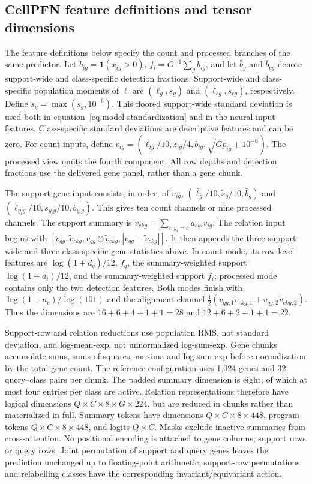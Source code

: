 \subsection*{CellPFN feature definitions and tensor dimensions}
\label{supp:model-details}
The feature definitions below specify the count and processed branches of the same predictor. Let $b_{ig}=\mathbf1(x_{ig}>0)$, $f_i=G^{-1}\sum_g b_{ig}$, and let $\bar b_g$ and $\bar b_{cg}$ denote support-wide and class-specific detection fractions. Support-wide and class-specific population moments of $\ell$ are $(\bar\ell_g,s_g)$ and $(\bar\ell_{cg},s_{cg})$, respectively. Define $\tilde s_g=\max(s_g,10^{-6})$. This floored support-wide standard deviation is used both in equation~\ref{eq:model-standardization} and in the neural input features. Class-specific standard deviations are descriptive features and can be zero. For count inputs, define $v_{ig}=(\ell_{ig}/10,z_{ig}/4,b_{ig},\sqrt{Gp_{ig}+10^{-6}})$. The processed view omits the fourth component. All row depths and detection fractions use the delivered gene panel, rather than a gene chunk.

The support-gene input consists, in order, of $v_{ig}$, $(\bar\ell_g/10,\tilde s_g/10,\bar b_g)$ and $(\bar\ell_{y_i g}/10,s_{y_i g}/10,\bar b_{y_i g})$. This gives ten count channels or nine processed channels. The support summary is $\tilde v_{ckg}=\sum_{i:y_i=c}a_{cki}v_{ig}$. The relation input begins with $[v_{qg},\tilde v_{ckg},v_{qg}\odot\tilde v_{ckg},|v_{qg}-\tilde v_{ckg}|]$. It then appends the three support-wide and three class-specific gene statistics above. In count mode, its row-level features are $\log(1+d_q)/12$, $f_q$, the summary-weighted support $\log(1+d_i)/12$, and the summary-weighted support $f_i$; processed mode contains only the two detection features. Both modes finish with $\log(1+n_c)/\log(101)$ and the alignment channel $\tfrac12(v_{qg,1}\tilde v_{ckg,1}+v_{qg,2}\tilde v_{ckg,2})$. Thus the dimensions are $16+6+4+1+1=28$ and $12+6+2+1+1=22$.

Support-row and relation reductions use population RMS, not standard deviation, and log-mean-exp, not unnormalized log-sum-exp. Gene chunks accumulate sums, sums of squares, maxima and log-sum-exp before normalization by the total gene count. The reference configuration uses 1,024 genes and 32 query--class pairs per chunk. The padded summary dimension is eight, of which at most four entries per class are active. Relation representations therefore have logical dimensions $Q\times C\times8\times G\times224$, but are reduced in chunks rather than materialized in full. Summary tokens have dimensions $Q\times C\times8\times448$, program tokens $Q\times C\times8\times448$, and logits $Q\times C$. Masks exclude inactive summaries from cross-attention. No positional encoding is attached to gene columns, support rows or query rows. Joint permutation of support and query genes leaves the prediction unchanged up to floating-point arithmetic; support-row permutations and relabelling classes have the corresponding invariant/equivariant action.

